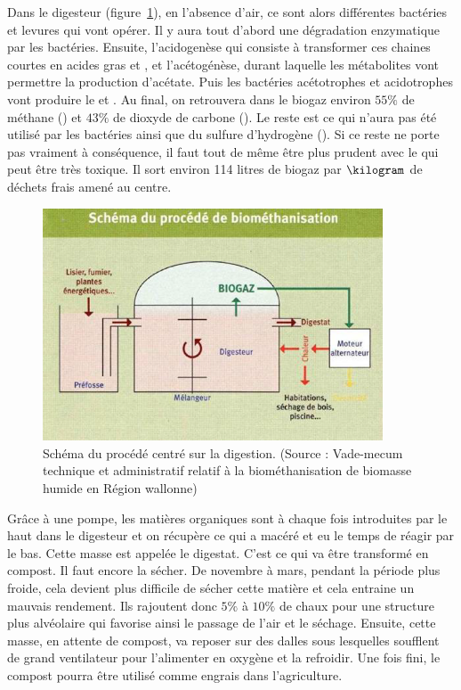 Dans le digesteur (figure~\ref{fig:biometh2}), en l'absence d'air, ce sont alors différentes bactéries et levures qui vont opérer. Il y aura tout d'abord une dégradation enzymatique par les bactéries. Ensuite, l'acidogenèse qui consiste à transformer ces chaines courtes en acides gras et , et l'acétogénèse, durant laquelle les métabolites vont permettre la production d'acétate. Puis les bactéries acétotrophes et acidotrophes vont produire le  et . Au final, on retrouvera dans le biogaz environ $55\%$ de méthane () et $43\%$ de dioxyde de carbone (). Le reste est ce qui n'aura pas été utilisé par les bactéries ainsi que du sulfure d'hydrogène (). Si ce reste ne porte pas vraiment à conséquence, il faut tout de même être plus prudent avec le  qui peut être très toxique. Il sort environ 114 litres de biogaz par $\kilogram$ de déchets frais amené au centre.

\begin{figure}
\centering
\includegraphics[width=0.9\textwidth]{img/biometh2}
\caption{Schéma du procédé centré sur la digestion. (Source : Vade-mecum technique et administratif relatif à la biométhanisation de biomasse humide en Région wallonne)}
\label{fig:biometh2}
\end{figure}

Grâce à une pompe, les matières organiques sont à chaque fois introduites par le haut dans le digesteur et on récupère ce qui a macéré et eu le temps de réagir par le bas. Cette masse est appelée le digestat. C'est ce qui va être transformé en compost. Il faut encore la sécher. De novembre à mars, pendant la période plus froide, cela devient plus difficile de sécher cette matière et cela entraine un mauvais rendement. Ils rajoutent donc $5\%$ à $10\%$ de chaux pour une structure plus alvéolaire qui favorise ainsi le passage de l'air et le séchage. Ensuite, cette masse, en attente de compost, va reposer sur des dalles sous lesquelles soufflent de grand ventilateur pour l'alimenter en oxygène et la refroidir. Une fois fini, le compost pourra être utilisé comme engrais dans l'agriculture.

